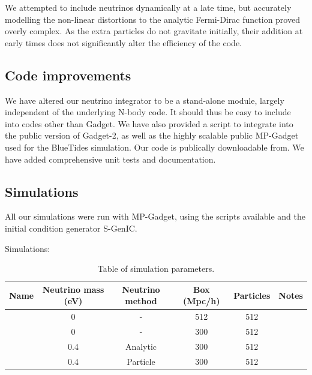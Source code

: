 \documentclass[useAMS, usenatbib]{mnras}
\begin{document}
We attempted to include neutrinos dynamically at a late time, but
accurately modelling the non-linear distortions to the analytic
Fermi-Dirac function proved overly complex. As the extra particles
do not gravitate initially, their addition at early times does
not significantly alter the efficiency of the code.


\subsection{Code improvements}
\label{sec:code}

We have altered our neutrino integrator to be a stand-alone module, largely
independent of the underlying N-body code. It should thus be easy to include
into codes other than Gadget. We have also provided a script to integrate into the
public version of Gadget-2, as well as the highly scalable public MP-Gadget
used for the BlueTides simulation. Our code is publically downloadable from.
We have added comprehensive unit tests and documentation.

\subsection{Simulations}
\label{sec:simulations}

All our simulations were run with MP-Gadget, using the scripts available
and the initial condition generator S-GenIC.

Simulations:
\begin{table}
\begin{center}
\begin{tabular}{|l|c|c|c|c|l|}
\hline
Name & Neutrino mass (eV) & Neutrino method & Box (Mpc/h) & Particles & Notes \\
\hline
    &       0             &    -          & 512         & 512       &       \\
    &       0             &    -          & 300         & 512       &       \\
    &     0.4             &   Analytic    & 300         & 512       &       \\
    &     0.4             &   Particle    & 300         & 512       &       \\

\hline
\end{tabular}
\end{center}
\caption{Table of simulation parameters.
}
\label{tab:simulations}
\end{table}
\end{document}
